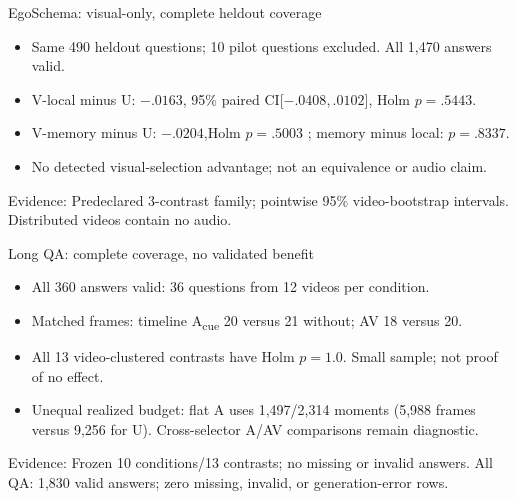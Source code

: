 \documentclass[aspectratio=169,11pt]{beamer}
\newcommand{\Acue}{A\textsubscript{cue}}
\newcommand{\source}[1]{\vfill{\tiny\color{gray}Evidence: #1}}
\begin{document}
\begin{frame}{EgoSchema: visual-only, complete heldout coverage}
\centering\small

\vspace{4mm}
\begin{itemize}
\item Same 490 heldout questions; 10 pilot questions excluded. All 1,470 answers valid.
\item V-local minus U: $-.0163$, 95\% paired CI[$-.0408,.0102$], Holm $p=.5443$.
\item V-memory minus U: $-.0204$,Holm $p=.5003$ ; memory minus local: $p=.8337$.
\item No detected visual-selection advantage; not an equivalence or audio claim.
\end{itemize}
\source{Predeclared 3-contrast family; pointwise 95\% video-bootstrap intervals. Distributed videos contain no audio.}
\end{frame}

\begin{frame}{Long QA: complete coverage, no validated benefit}
\centering\small

\vspace{4mm}
\begin{itemize}
\item All 360 answers valid: 36 questions from 12 videos per condition.
\item Matched frames: timeline \Acue{} 20 versus 21 without; AV 18 versus 20.
\item All 13 video-clustered contrasts have Holm $p=1.0$. Small sample; not proof of no effect.
\item Unequal realized budget: flat A uses 1,497/2,314 moments (5,988 frames versus 9,256 for U). Cross-selector A/AV comparisons remain diagnostic.
\end{itemize}
\source{Frozen 10 conditions/13 contrasts; no missing or invalid answers. All QA: 1,830 valid answers; zero missing, invalid, or generation-error rows.}
\end{frame}
\end{document}

